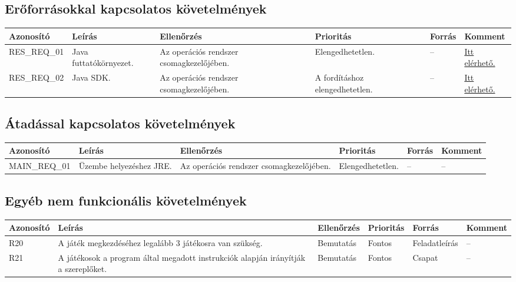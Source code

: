 \subsection{Erőforrásokkal kapcsolatos követelmények}


\begin{longtable}{| l | l | p{3cm} | p{3cm} | l | l |}
\hline
\textbf{Azonosító}   & \textbf{Leírás} & \textbf{Ellenőrzés} & \textbf{Prioritás} & \textbf{Forrás} & \textbf{Komment} \tabularnewline
\hline\hline
RES\_REQ\_01 & Java futtatókörnyezet. & Az operációs rendszer csomagkezelőjében. & Elengedhetetlen. & -- & \href{https://www.java.com/en/download/}{Itt elérhető.} \tabularnewline
\hline
RES\_REQ\_02 & Java SDK. & Az operációs rendszer csomagkezelőjében. & A fordításhoz elengedhetetlen. & -- & \href{https://www.oracle.com/java/technologies/javase/javase-jdk8-downloads.html}{Itt elérhető.} \tabularnewline
\hline
\end{longtable}


\subsection{Átadással kapcsolatos követelmények}

\begin{longtable}{| l | l | p{3cm} | l | l | l |}
\hline
\textbf{Azonosító}   & \textbf{Leírás} & \textbf{Ellenőrzés} & \textbf{Prioritás} & \textbf{Forrás} & \textbf{Komment} \tabularnewline
\hline\hline
MAIN\_REQ\_01 & Üzembe helyezéshez JRE. & Az operációs rendszer csomagkezelőjében. & Elengedhetetlen. & -- & -- \tabularnewline
\hline
\end{longtable}

\subsection{Egyéb nem funkcionális követelmények}

\begin{longtable}{| l | p{3cm} | l | l | l | l |}
\hline
\textbf{Azonosító}   & \textbf{Leírás} & \textbf{Ellenőrzés} & \textbf{Prioritás} & \textbf{Forrás} & \textbf{Komment} \tabularnewline
\hline\hline
R20 & A játék megkezdéséhez legalább 3 játékosra van szükség. & Bemutatás & Fontos & Feladatleírás & -- \tabularnewline
\hline
R21 & A játékosok a program által megadott instrukciók alapján irányítják a szereplőket. & Bemutatás & Fontos & Csapat & -- \tabularnewline
\hline
\end{longtable}


